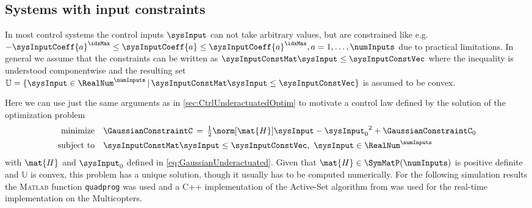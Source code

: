 \subsection{Systems with input constraints}
In most control systems the control inputs $\sysInput$ can not take arbitrary values, but are constrained like e.g. $-\sysInputCoeff{a}^{\idxMax} \leq \sysInputCoeff{a} \leq \sysInputCoeff{a}^{\idxMax}, a=1,\ldots,\numInputs$ due to practical limitations.
In general we assume that the constraints can be written as $\sysInputConstMat \sysInput \leq \sysInputConstVec$ where the inequality is understood componentwise and the resulting set $\mathbb{U} = \{ \sysInput \in \RealNum^\numInputs \, | \, \sysInputConstMat \sysInput \leq \sysInputConstVec \}$ is assumed to be convex.

Here we can use just the same arguments as in \autoref{sec:CtrlUnderactuatedOptim} to motivate a control law defined by the solution of the optimization problem
\begin{align}\label{eq:MinProbInputConstraints}
 \begin{array}{rl}
  \text{minimize} & \GaussianConstraintC \, = \, \tfrac{1}{2} \norm[\mat{H}]{\sysInput - \sysInput_0}^2 + \GaussianConstraintC_0
  \\[1ex]
  \text{subject to} &\sysInputConstMat \sysInput \leq \sysInputConstVec, \ \sysInput \in \RealNum^\numInputs 
 \end{array}
\end{align}
with $\mat{H}$ and $\sysInput_0$ defined in \eqref{eq:GaussianUnderactuated}.
Given that $\mat{H} \in \SymMatP(\numInputs)$ is positive definite and $\mathbb{U}$ is convex, this problem has a unique solution, though it usually has to be computed numerically.
For the following simulation results the \textsc{Matlab} function \texttt{quadprog} was used and a C++ implementation of the Active-Set algorithm from \cite[Algorithm 16.3]{Nocedal:NumericalOptimization} was used for the real-time implementation on the Multicopters.


